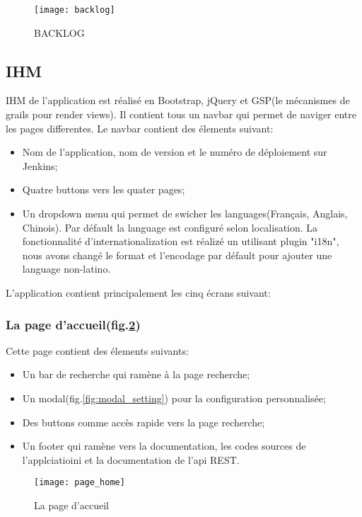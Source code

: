 \begin{figure}[ht]
 \centering
 \texttt{[image: backlog]}
 \caption{BACKLOG}
 \label{fig:backlog}
\end{figure}

\subsection{IHM}
IHM de l'application est réalisé en Bootstrap, jQuery et GSP(le mécanismes de grails pour render views).
Il contient tous un navbar qui permet de naviger entre les pages differentes.
Le navbar contient des élements suivant:
\begin{itemize}
 \item Nom de l'application, nom de version et le numéro de déploiement sur Jenkins;
 \item Quatre buttons vers les quater pages;
 \item Un dropdown menu qui permet de swicher les languages(Français, Anglais, Chinois).
 Par défault la language est configuré selon localisation.
La fonctionnalité d'internationalization est réalizé un utilisant plugin "i18n",
nous avons changé le format et l'encodage par défault pour ajouter une language non-latino.
\end{itemize}

L'application contient principalement les cinq écrans suivant:

\subsubsection{La page d'accueil(fig.\ref{fig:page_home})}
Cette page contient des élements suivants:
\begin{itemize}
 \item Un bar de recherche qui ramène à la page recherche;
 \item Un modal(fig.\ref{fig:modal_setting}) pour la configuration personnalisée;
 \item Des buttons comme accès rapide vers la page recherche;
 \item Un footer qui ramène vers la documentation, les codes sources de l'applciatioini et la documentation de l'api REST.
\end{itemize}

\begin{figure}[ht]
 \centering
 \texttt{[image: page\_home]}
 \caption{La page d'accueil}
 \label{fig:page_home}
\end{figure}

